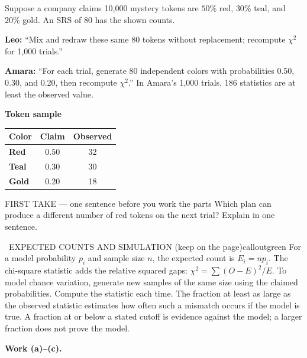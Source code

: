 \documentclass[11pt]{article}
\begin{document}


Suppose a company claims 10{,}000 mystery tokens are $50\%$ red, $30\%$ teal, and $20\%$ gold. An SRS of 80 has the shown counts.\par\smallskip \textbf{Leo:} ``Mix and redraw these same 80 tokens without replacement; recompute $\chi^2$ for 1,000 trials.''\par \textbf{Amara:} ``For each trial, generate 80 independent colors with probabilities 0.50, 0.30, and 0.20, then recompute $\chi^2$.'' In Amara's 1,000 trials, 186 statistics are at least the observed value.\par
\begin{center}
\textbf{Token sample}\par\smallskip
\begin{tabular}{|l|c|c|}
\hline
\textbf{Color} & \textbf{Claim} & \textbf{Observed} \\ \hline
\textbf{Red} & $0.50$ & 32 \\ \hline
\textbf{Teal} & $0.30$ & 30 \\ \hline
\textbf{Gold} & $0.20$ & 18 \\ \hline
\end{tabular}
\end{center}
\begin{firsttakebox}{FIRST TAKE --- one sentence before you work the parts}
Which plan can produce a different number of red tokens on the next trial? Explain in one sentence.
\workspace{0.9in}
\end{firsttakebox}

\begin{callout}{\IconBook\ EXPECTED COUNTS AND SIMULATION (keep on the page)}{calloutgreen}
For a model probability $p_i$ and sample size $n$, the expected count is $E_i=np_i$.
The chi-square statistic adds the relative squared gaps: $\chi^2=\sum (O-E)^2/E$.
To model chance variation, generate new samples of the same size using the claimed probabilities.
Compute the statistic each time. The fraction at least as large as the observed statistic estimates
how often such a mismatch occurs if the model is true. A fraction at or below a stated cutoff is
evidence against the model; a larger fraction does not prove the model.
\end{callout}

\newpage
\textbf{Work (a)--(c).}\par\smallskip
\end{document}
